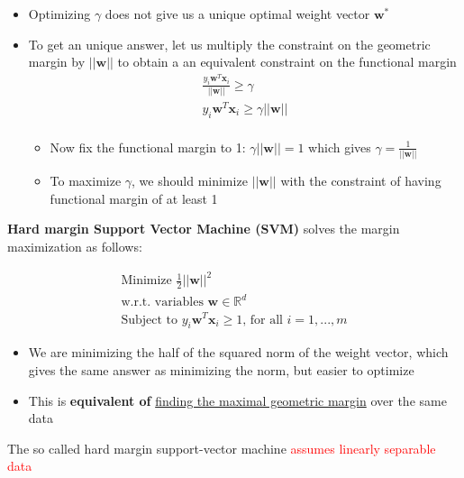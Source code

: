 \documentclass[12pt, a4paper]{article}
\begin{document}
\begin{itemize}
  \item Optimizing $\gamma$ does not give us a unique optimal weight vector $\mathbf{w}^*$
  \item To get an unique answer, let us multiply the constraint on the geometric margin by $||\mathbf{w}||$ to obtain a an equivalent constraint on the functional margin
  \begin{gather*}
  \frac{y_i \mathbf{w}^T \mathbf{x}_i}{||\mathbf{w}||} \geq \gamma \\
  y_i \mathbf{w}^T \mathbf{x}_i \geq \gamma ||\mathbf{w}|| \\
  \end{gather*}
  \begin{itemize}
    \item Now fix the functional margin to 1: $\gamma ||\mathbf{w}|| = 1$ which gives $\gamma = \frac{1}{||\mathbf{w}||}$
    \item To maximize $\gamma$, we should minimize $||\mathbf{w}||$ with the constraint of having functional margin of at least 1
  \end{itemize}
\end{itemize}


\bigskip


\textbf{Hard margin Support Vector Machine (SVM)} solves the margin maximization as follows:

\begin{gather*}
\text{Minimize } \frac{1}{2} ||\mathbf{w}||^2 \\
\text{w.r.t. variables } \mathbf{w} \in \mathbb{R}^d \\
\text{Subject to } y_i \mathbf{w}^T \mathbf{x}_i \geq 1 \text{, for all } i = 1, ..., m
\end{gather*}

\begin{itemize}
  \item We are minimizing the half of the squared norm of the weight vector, which gives the same answer as minimizing the norm, but easier to optimize
  \item This is \textbf{equivalent of} \uline{finding the maximal geometric margin} over the same data
\end{itemize}

The so called hard margin support-vector machine \textcolor{red}{assumes linearly separable data}
\end{document}
